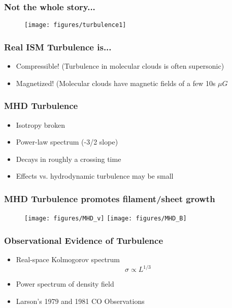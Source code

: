 \documentclass[serif,mathserif]{beamer}
\begin{document}
\begin{frame}
	\frametitle{Not the whole story...}
  \begin{figure}[t]
	\centering
	\texttt{[image: figures/turbulence1]}
  \end{figure}
\end{frame}

\begin{frame}
	\frametitle{Real ISM Turbulence is...}
  \begin{itemize}
	  \item Compressible! (Turbulence in molecular clouds is often supersonic)
	  \item Magnetized! (Molecular clouds have magnetic fields of a few 10s $\mu
		  G$
  \end{itemize}
\end{frame}

\begin{frame}
	\frametitle{MHD Turbulence}
  \begin{itemize}
	  \item Isotropy broken
	  \item Power-law spectrum (-3/2 slope)
	  \item Decays in roughly a crossing time
	  \item Effects vs. hydrodynamic turbulence may be small
  \end{itemize}
\end{frame}

\begin{frame}
	\frametitle{MHD Turbulence promotes filament/sheet growth}
  \begin{figure}[t]
	\centering
	\texttt{[image: figures/MHD\_v]}
	\texttt{[image: figures/MHD\_B]}
  \end{figure}
\end{frame}

\begin{frame}
	\frametitle{Observational Evidence of Turbulence}
	\begin{itemize}
		\item Real-space Kolmogorov spectrum
    \begin{equation*}
		\sigma \propto L^{1/3}
    \end{equation*}
		\item Power spectrum of density field
		\item Larson's 1979 and 1981 CO Observations
	\end{itemize}
\end{frame}
\end{document}
